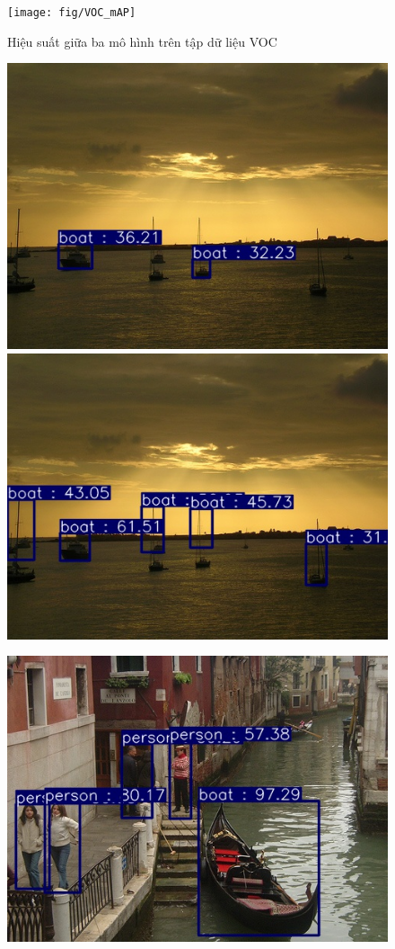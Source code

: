 \documentclass[a4paper]{article}
\begin{document}
\begin{figure}[h]
	\centering
	\texttt{[image: fig/VOC\_mAP]}
	\caption{Hiệu suất giữa ba mô hình trên tập dữ liệu VOC}
	\label{fig:vocmap}
\end{figure}


\begin{figure}[h]
	\center
	\begin{multicols}{2}
		\includegraphics[width=0.7\linewidth]{fig/VOC_41}
		\includegraphics[width=0.7\linewidth]{fig/VOC_FPN_41}
	\end{multicols}
	\begin{multicols}{2}
		\includegraphics[width=0.7\linewidth]{fig/VOC_578}

\end{multicols}
\end{figure}
\end{document}
